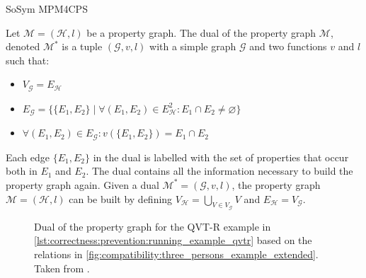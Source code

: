 \begin{copiedFrom}{SoSym MPM4CPS}
\begin{definition}
Let $\mathcal{M} = (\mathcal{H}, l)$ be a property graph. The dual of the property graph $\mathcal{M}$, denoted $\mathcal{M^{*}}$ is a tuple $(\mathcal{G}, v, l)$ with a simple graph $\mathcal{G}$ and two functions $v$ and $l$ such that:
    \begin{itemize}
        \item $V_{\mathcal{G}} = E_{\mathcal{H}}$
        \item $E_{\mathcal{G}} = \{\{E_1, E_2\} \mid \forall (E_1, E_2) \in E_{\mathcal{H}}^2 : E_1 \cap E_2 \neq \varnothing\}$
        \item $\forall (E_1, E_2) \in E_{\mathcal{G}} : v(\{E_1, E_2\}) = E_1 \cap E_2$
    \end{itemize}
\end{definition}

Each edge $\{E_1, E_2\}$ in the dual is labelled with the set of properties that occur both in $E_1$ and $E_2$. The dual contains all the information necessary to build the property graph again. Given a dual $\mathcal{M^{*}} = (\mathcal{G}, v, l)$, the property graph $\mathcal{M} = (\mathcal{H}, l)$ can be built by defining $V_{\mathcal{H}} = \bigcup_{V \in V_{\mathcal{G}}} V$ and $E_{\mathcal{H}} = V_{\mathcal{G}}$. 

\begin{figure}
    \centering
    \resizebox{0.8\linewidth}{!}{}
    \resizebox{\linewidth}{!}{}
    \caption[Dual of the property graph for the running example]{Dual of the property graph for the QVT-R example in \autoref{lst:correctness:prevention:running_example_qvtr} based on the relations in \autoref{fig:compatibility:three_persons_example_extended}. Taken from .}
    \label{fig:compatibility:dual_propertygraph_re}
\end{figure}


\end{copiedFrom}
